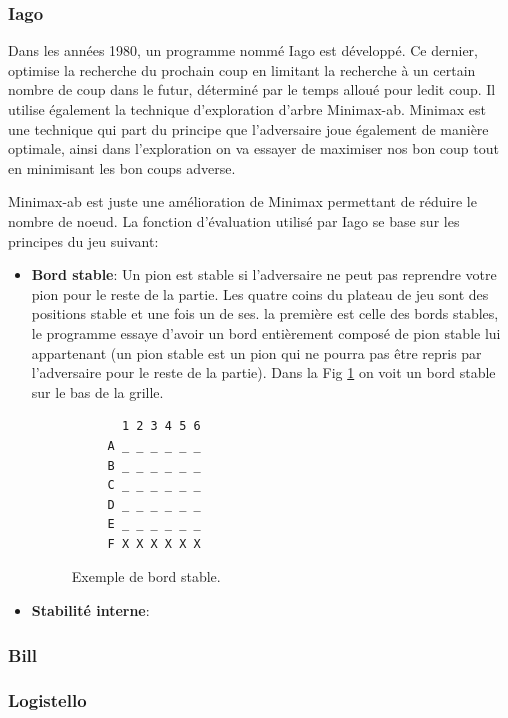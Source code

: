 \documentclass[10pt,a4paper]{article}
\begin{document}
\subsubsection {Iago}
Dans les années 1980, un programme nommé Iago est développé.
Ce dernier, optimise la recherche du prochain coup en limitant la recherche à un certain nombre de coup dans le futur, déterminé par le temps alloué pour ledit coup.
Il utilise également la technique d'exploration d'arbre Minimax-ab. Minimax est une technique qui part du principe que l'adversaire joue également de manière optimale, ainsi dans l'exploration on va essayer de maximiser nos bon coup tout en minimisant les bon coups adverse.

Minimax-ab est juste une amélioration de Minimax permettant de réduire le nombre de noeud.
La fonction d'évaluation utilisé par Iago se base sur les principes du jeu suivant:
\begin {itemize}
\item \textbf{Bord stable}: Un pion est stable si l'adversaire ne peut pas reprendre votre pion pour le reste de la partie. Les quatre coins du plateau de jeu sont des positions stable et une fois un de ses.
la première est celle des bords stables, le programme essaye d'avoir un bord entièrement composé de pion stable lui appartenant (un pion stable est un pion qui ne pourra pas être repris par l'adversaire pour le reste de la partie). Dans la Fig \ref{fig:bord_stable} on voit un bord stable sur le bas de la grille.

 \begin{figure}[H]    
    \centering
    \begin{BVerbatim}
       1 2 3 4 5 6
     A _ _ _ _ _ _
     B _ _ _ _ _ _
     C _ _ _ _ _ _
     D _ _ _ _ _ _
     E _ _ _ _ _ _
     F X X X X X X 
    \end{BVerbatim}
    \caption {Exemple de bord stable.\label{fig:bord_stable}}
 \end{figure}
\item \textbf{Stabilité interne}:
  \end {itemize}

\subsubsection {Bill}

\subsubsection {Logistello}
\newpage
\end{document}
